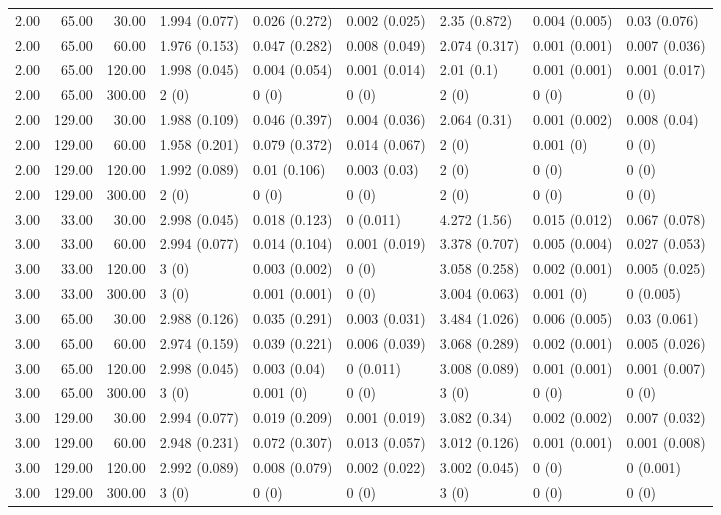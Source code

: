 \begin{table}[ht]
\begin{tabular}{rrrllllll}
  2.00 & 65.00 & 30.00 & 1.994 (0.077) & 0.026 (0.272) & 0.002 (0.025) & 2.35 (0.872) & 0.004 (0.005) & 0.03 (0.076) \\ 
  2.00 & 65.00 & 60.00 & 1.976 (0.153) & 0.047 (0.282) & 0.008 (0.049) & 2.074 (0.317) & 0.001 (0.001) & 0.007 (0.036) \\ 
  2.00 & 65.00 & 120.00 & 1.998 (0.045) & 0.004 (0.054) & 0.001 (0.014) & 2.01 (0.1) & 0.001 (0.001) & 0.001 (0.017) \\ 
  2.00 & 65.00 & 300.00 & 2 (0) & 0 (0) & 0 (0) & 2 (0) & 0 (0) & 0 (0) \\ 
  2.00 & 129.00 & 30.00 & 1.988 (0.109) & 0.046 (0.397) & 0.004 (0.036) & 2.064 (0.31) & 0.001 (0.002) & 0.008 (0.04) \\ 
  2.00 & 129.00 & 60.00 & 1.958 (0.201) & 0.079 (0.372) & 0.014 (0.067) & 2 (0) & 0.001 (0) & 0 (0) \\ 
  2.00 & 129.00 & 120.00 & 1.992 (0.089) & 0.01 (0.106) & 0.003 (0.03) & 2 (0) & 0 (0) & 0 (0) \\ 
  2.00 & 129.00 & 300.00 & 2 (0) & 0 (0) & 0 (0) & 2 (0) & 0 (0) & 0 (0) \\ 
  3.00 & 33.00 & 30.00 & 2.998 (0.045) & 0.018 (0.123) & 0 (0.011) & 4.272 (1.56) & 0.015 (0.012) & 0.067 (0.078) \\ 
  3.00 & 33.00 & 60.00 & 2.994 (0.077) & 0.014 (0.104) & 0.001 (0.019) & 3.378 (0.707) & 0.005 (0.004) & 0.027 (0.053) \\ 
  3.00 & 33.00 & 120.00 & 3 (0) & 0.003 (0.002) & 0 (0) & 3.058 (0.258) & 0.002 (0.001) & 0.005 (0.025) \\ 
  3.00 & 33.00 & 300.00 & 3 (0) & 0.001 (0.001) & 0 (0) & 3.004 (0.063) & 0.001 (0) & 0 (0.005) \\ 
  3.00 & 65.00 & 30.00 & 2.988 (0.126) & 0.035 (0.291) & 0.003 (0.031) & 3.484 (1.026) & 0.006 (0.005) & 0.03 (0.061) \\ 
  3.00 & 65.00 & 60.00 & 2.974 (0.159) & 0.039 (0.221) & 0.006 (0.039) & 3.068 (0.289) & 0.002 (0.001) & 0.005 (0.026) \\ 
  3.00 & 65.00 & 120.00 & 2.998 (0.045) & 0.003 (0.04) & 0 (0.011) & 3.008 (0.089) & 0.001 (0.001) & 0.001 (0.007) \\ 
  3.00 & 65.00 & 300.00 & 3 (0) & 0.001 (0) & 0 (0) & 3 (0) & 0 (0) & 0 (0) \\ 
  3.00 & 129.00 & 30.00 & 2.994 (0.077) & 0.019 (0.209) & 0.001 (0.019) & 3.082 (0.34) & 0.002 (0.002) & 0.007 (0.032) \\ 
  3.00 & 129.00 & 60.00 & 2.948 (0.231) & 0.072 (0.307) & 0.013 (0.057) & 3.012 (0.126) & 0.001 (0.001) & 0.001 (0.008) \\ 
  3.00 & 129.00 & 120.00 & 2.992 (0.089) & 0.008 (0.079) & 0.002 (0.022) & 3.002 (0.045) & 0 (0) & 0 (0.001) \\ 
  3.00 & 129.00 & 300.00 & 3 (0) & 0 (0) & 0 (0) & 3 (0) & 0 (0) & 0 (0) \\ 
   \hline
\end{tabular}
\end{table}
